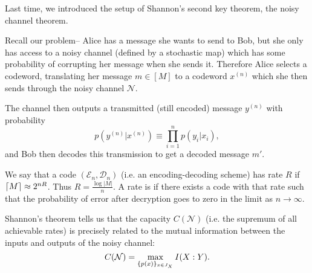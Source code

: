 Last time, we introduced the setup of Shannon's second key theorem, the noisy channel theorem.

Recall our problem-- Alice has a message she wants to send to Bob, but she only has access to a noisy channel (defined by a stochastic map) which has some probability of corrupting her message when she sends it. Therefore Alice selects a codeword, translating her message $m\in [M]$ to a codeword $x^{(n)}$ which she then sends through the noisy channel $\mathcal{N}$.

The channel then outputs a transmitted (still encoded) message $y^{(n)}$ with probability
\begin{equation}
    p(y^{(n)}|x^{(n)}) \equiv \prod_{i=1}^n p(y_i| x_i),
\end{equation}
and Bob then decodes this transmission to get a decoded message $m'$.

We say that a code $(\mathcal{E}_n,\mathcal{D}_n)$ (i.e. an encoding-decoding scheme) has rate $R$ if $\lceil M\rceil\approx 2^{nR}$. Thus $R =\frac{\log |M|}{n}$. A rate is  if there exists a code with that rate such that the probability of error after decryption goes to zero in the limit as $n\to \infty$.

Shannon's theorem tells us that the capacity $C(\mathcal{N})$ (i.e. the supremum of all achievable rates) is precisely related to the mutual information between the inputs and outputs of the noisy channel:
\begin{equation}
    C(\mathcal{N})=\max_{\{p(x)\}_{x\in J_X}} I(X: Y).
\end{equation}

